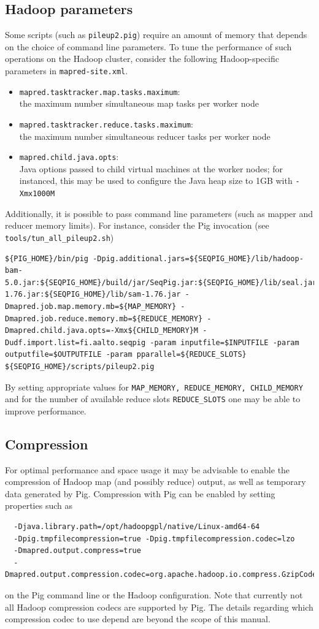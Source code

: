 \subsection{Hadoop parameters}

Some scripts (such as {\tt pileup2.pig}) require an amount of memory that
depends on the choice of command line parameters. To tune the performance of
such operations on the Hadoop cluster,
consider the following Hadoop-specific parameters in {\tt mapred-site.xml}.
\begin{itemize}
\item {\tt mapred.tasktracker.map.tasks.maximum}: \\the maximum number simultaneous map tasks per worker node
\item {\tt mapred.tasktracker.reduce.tasks.maximum}:\\ the maximum number simultaneous reducer tasks per worker node
\item {\tt mapred.child.java.opts}:\\ Java options passed to child virtual
	machines at the worker nodes; for instanced, this may be used to configure
	the Java heap size to 1GB with {\tt -Xmx1000M}
\end{itemize}
Additionally, it is possible to pass command line parameters (such as mapper and reducer memory limits).
For instance, consider the Pig invocation (see {\tt tools/tun\_all\_pileup2.sh})
\begin{lstlisting}
${PIG_HOME}/bin/pig -Dpig.additional.jars=${SEQPIG_HOME}/lib/hadoop-bam-5.0.jar:${SEQPIG_HOME}/build/jar/SeqPig.jar:${SEQPIG_HOME}/lib/seal.jar:${SEQPIG_HOME}/lib/picard-1.76.jar:${SEQPIG_HOME}/lib/sam-1.76.jar -Dmapred.job.map.memory.mb=${MAP_MEMORY} -Dmapred.job.reduce.memory.mb=${REDUCE_MEMORY} -Dmapred.child.java.opts=-Xmx${CHILD_MEMORY}M -Dudf.import.list=fi.aalto.seqpig -param inputfile=$INPUTFILE -param outputfile=$OUTPUTFILE -param pparallel=${REDUCE_SLOTS} ${SEQPIG_HOME}/scripts/pileup2.pig
\end{lstlisting}
By setting appropriate values for {\tt MAP\_MEMORY, REDUCE\_MEMORY,
CHILD\_MEMORY} and for the number of available reduce slots {\tt REDUCE\_SLOTS}
one may be able to improve performance.

\subsection{Compression}

For optimal performance and space usage it may be advisable to enable the compression of
Hadoop map (and possibly reduce) output, as well as temporary data generated
by Pig. Compression with Pig can be enabled by setting properties such as
\begin{lstlisting}
  -Djava.library.path=/opt/hadoopgpl/native/Linux-amd64-64
  -Dpig.tmpfilecompression=true -Dpig.tmpfilecompression.codec=lzo
  -Dmapred.output.compress=true
  -Dmapred.output.compression.codec=org.apache.hadoop.io.compress.GzipCodec
\end{lstlisting}
on the Pig command line or the Hadoop configuration. Note that currently not all
Hadoop compression codecs are supported by Pig.  The details regarding which
compression codec to use depend are beyond the scope of this manual.
